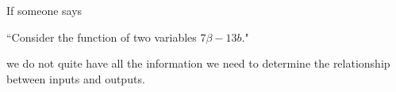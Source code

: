 \begin{center}
\href{https://www.youtube.com/watch?v=dvoG5P9Uczg}{\takeone} \hspace{1cm}\scalebox{1.2}{\ttfamily A Sophisticated Review of Functions }
\end{center}
If someone says 
\vspace{-.01cm}
\begin{center}
``Consider the function of two variables $7\beta-13 b$." 
\end{center}
we do not quite have all the information we need to determine the relationship between inputs and outputs. 

